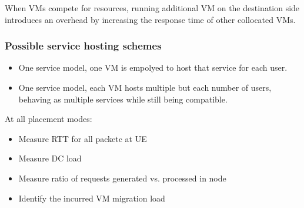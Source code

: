 When VMs compete for resources, running additional VM on the destination side introduces an overhead by increasing the response time of other collocated VMs.  

\subsubsection{Possible service hosting schemes}

\begin{itemize}
\item One service model, one VM is empolyed to host that service for each user.
\item One service model, each VM hosts multiple but each number of users, behaving as multiple services while still being compatible.
\end{itemize}


At all placement modes:
\begin{itemize}
\item Measure RTT for all packetc at UE
\item Measure DC load
\item Measure ratio of requests generated vs. processed in \xcloud node
\item Identify the incurred VM migration load
\end{itemize}
